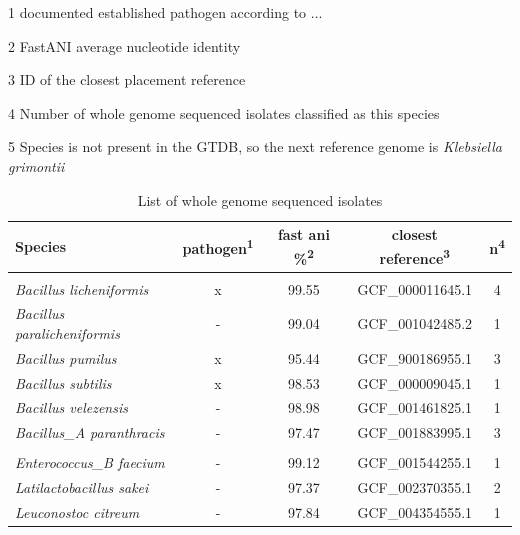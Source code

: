 \documentclass[preprint,3p,
a4paper]{elsarticle} %
\begin{document}
\begin{ThreePartTable}
\begin{TableNotes}
\item[1] documented established pathogen according to ...
\item[2] FastANI average nucleotide identity
\item[3] ID of the closest placement reference
\item[4] Number of whole genome sequenced isolates classified as this species
\item[5] Species is not present in the GTDB, so the next reference genome is \textit{Klebsiella grimontii}
\end{TableNotes}
\begin{longtable}[b]{lcccc}
\caption{\label{tab:tab2}\label{tab2}List of whole genome sequenced isolates}\\
\toprule
Species & pathogen\textsuperscript{1} & fast ani \%\textsuperscript{2} & closest reference\textsuperscript{3} & n\textsuperscript{4}\\
\midrule
\addlinespace[0.3em]
\multicolumn{5}{l}{\textit{Bacillales}}\\
\hspace{1em}\em{Bacillus licheniformis} & x & 99.55 & GCF\_000011645.1 & 4\\
\hspace{1em}\em{Bacillus paralicheniformis} & - & 99.04 & GCF\_001042485.2 & 1\\
\hspace{1em}\em{Bacillus pumilus} & x & 95.44 & GCF\_900186955.1 & 3\\
\hspace{1em}\em{Bacillus subtilis} & x & 98.53 & GCF\_000009045.1 & 1\\
\hspace{1em}\em{Bacillus velezensis} & - & 98.98 & GCF\_001461825.1 & 1\\
\hspace{1em}\em{Bacillus\_A paranthracis} & - & 97.47 & GCF\_001883995.1 & 3\\
\addlinespace[0.3em]
\multicolumn{5}{l}{\textit{Lactobacillales}}\\
\hspace{1em}\em{Enterococcus\_B faecium} & - & 99.12 & GCF\_001544255.1 & 1\\
\hspace{1em}\em{Latilactobacillus sakei} & - & 97.37 & GCF\_002370355.1 & 2\\
\hspace{1em}\em{Leuconostoc citreum} & - & 97.84 & GCF\_004354555.1 & 1\\

\end{longtable}
\end{ThreePartTable}
\end{document}
